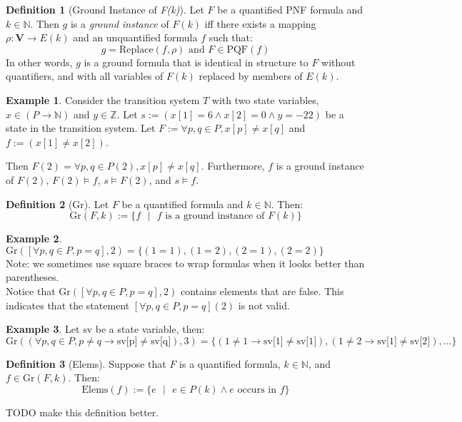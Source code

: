 \documentclass[12pt]{article}
\theoremstyle{definition}
\newtheorem{definition}{Definition}
\newtheorem{example}{Example}
\theoremstyle{remark}
\newcommand{\st}{\text{ }|\text{ }}
\newcommand{\gr}{\text{Gr}}
\newcommand{\elems}{\text{Elems}}
\newcommand{\PQF}{\text{PQF}}
\newcommand{\replace}{\text{Replace}}
\begin{document}
\begin{definition}[Ground Instance of \textit{F(k)}]
  Let $F$ be a quantified PNF formula and $k \in \mathbb{N}$.  Then $g$ is a \textit{ground instance} of $F(k)$ iff there exists a mapping $\rho : \mathbf{V} \to E(k)$ and an unquantified formula $f$ such that:
  $$g = \replace(f,\rho) \text{ and } F \in \PQF(f)$$
  In other words, $g$ is a ground formula that is identical in structure to $F$ without quantifiers, and with all variables of $F(k)$ replaced by members of $E(k)$.
\end{definition}

\begin{example}
  Consider the transition system $T$ with two state variables, $x \in (P \to \mathbb{N})$ and $y \in \mathbb{Z}$.  Let $s := (x[1]=6 \land x[2]=0 \land y=-22)$ be a state in the transition system.  Let $F := \forall p,q \in P, x[p] \neq x[q]$ and $f := (x[1] \neq x[2])$.

  Then $F(2) = \forall p,q \in P(2), x[p] \neq x[q]$.  Furthermore, $f$ is a ground instance of $F(2)$, $F(2) \models f$, $s \models F(2)$, and $s \models f$.
\end{example}

\begin{definition}[Gr]
  Let $F$ be a quantified formula and $k \in \mathbb{N}$.  Then:
  $$\gr(F,k) := \{f \st f \text{ is a ground instance of } F(k)\}$$
\end{definition}

\begin{example}
  $\gr([\forall p,q \in P, p=q],2) = \{(1=1),(1=2),(2=1),(2=2)\}$\\
  Note: we sometimes use square braces to wrap formulas when it looks better than parentheses.\\
  Notice that $\gr([\forall p,q \in P, p=q],2)$ contains elements that are false.  This indicates that the statement $[\forall p,q \in P, p=q](2)$ is not valid.
\end{example}
\begin{example}
  Let $\text{sv}$ be a state variable, then:
  $$\gr((\forall p,q \in P, p \neq q \rightarrow \text{sv[p]} \neq \text{sv[q]}),3) = \{(1 \neq 1 \rightarrow \text{sv[1]} \neq \text{sv[1]}),(1 \neq 2 \rightarrow \text{sv[1]} \neq \text{sv[2]}),...\}$$
\end{example}

\begin{definition}[Elems]
  Suppose that $F$ is a quantified formula, $k \in \mathbb{N}$, and $f \in \gr(F,k)$.  Then:
  $$\elems(f) := \{e \st e \in P(k) \land e \text{ occurs in } f\}$$

  TODO make this definition better.
\end{definition}
\end{document}
